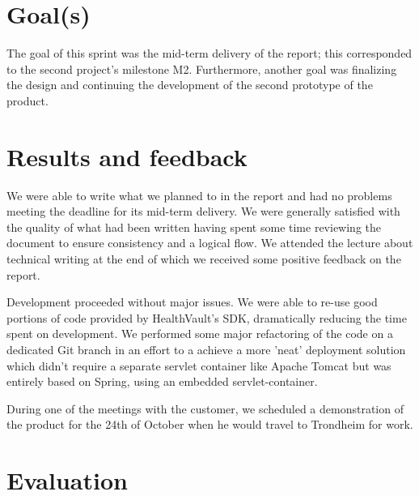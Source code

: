 \fi

\section{Goal(s)}

The goal of this sprint was the mid-term delivery of the report; this corresponded to
the second project's milestone M2. Furthermore, another goal was finalizing the design and continuing
the development of the second prototype of the product.%


\section{Results and feedback}

We were able to write what we planned to in the report and had no problems meeting the deadline for
its mid-term delivery. We were generally satisfied with the quality of what had
been written having spent some time reviewing the document to ensure consistency and a logical flow.
We attended the lecture about technical writing at the end of which we received some positive
feedback on the report.

Development proceeded without major issues. We were able to re-use good portions of code provided
by HealthVault's SDK, dramatically reducing the time spent on development.
We performed some major refactoring of the code on a dedicated Git branch in an effort
to a achieve a more 'neat' deployment solution which didn't require a separate servlet container like
Apache Tomcat but was entirely based on Spring, using an embedded servlet-container.

During one of the meetings with the customer, we scheduled a demonstration of the product
for the 24th of October when he would travel to Trondheim for work.

\section{Evaluation}


